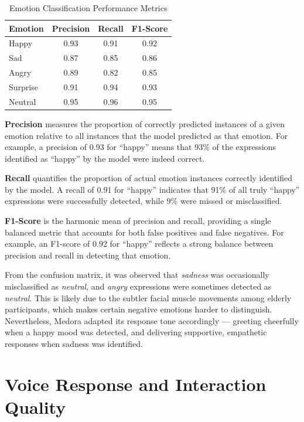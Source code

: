 \begin{table}[h!]
\centering
\caption{Emotion Classification Performance Metrics}
\begin{tabular}{|l|c|c|c|}
\hline
\textbf{Emotion} & \textbf{Precision} & \textbf{Recall} & \textbf{F1-Score} \\ \hline
Happy    & 0.93 & 0.91 & 0.92 \\ \hline
Sad      & 0.87 & 0.85 & 0.86 \\ \hline
Angry    & 0.89 & 0.82 & 0.85 \\ \hline
Surprise & 0.91 & 0.94 & 0.93 \\ \hline
Neutral  & 0.95 & 0.96 & 0.95 \\ \hline
\end{tabular}
\end{table}

\textbf{Precision} measures the proportion of correctly predicted instances of a given emotion 
relative to all instances that the model predicted as that emotion. For example, a precision 
of 0.93 for ``happy'' means that 93\% of the expressions identified as ``happy'' by the model 
were indeed correct.

\textbf{Recall} quantifies the proportion of actual emotion instances correctly identified by 
the model. A recall of 0.91 for ``happy'' indicates that 91\% of all truly ``happy'' expressions 
were successfully detected, while 9\% were missed or misclassified.

\textbf{F1-Score} is the harmonic mean of precision and recall, providing a single balanced 
metric that accounts for both false positives and false negatives. For example, an F1-score 
of 0.92 for ``happy'' reflects a strong balance between precision and recall in detecting 
that emotion.

From the confusion matrix, it was observed that \textit{sadness} was occasionally misclassified 
as \textit{neutral}, and \textit{angry} expressions were sometimes detected as \textit{neutral}. 
This is likely due to the subtler facial muscle movements among elderly participants, which 
makes certain negative emotions harder to distinguish. Nevertheless, Medora adapted its 
response tone accordingly — greeting cheerfully when a happy mood was detected, and delivering 
supportive, empathetic responses when sadness was identified.


\section{Voice Response and Interaction Quality}

